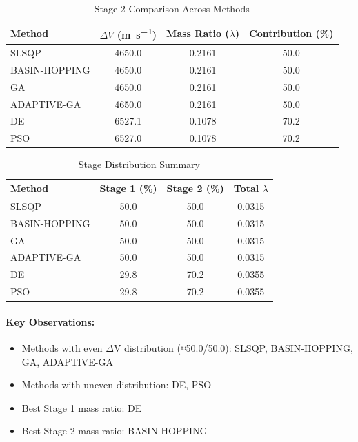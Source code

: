 \documentclass{article}
\begin{document}
\begin{table}[H]
\centering
\caption{Stage 2 Comparison Across Methods}
\begin{tabular}{lS[table-format=4.1]S[table-format=1.4]S[table-format=3.1]}
\toprule
Method & {$\Delta V$ (\si{\meter\per\second})} & {Mass Ratio ($\lambda$)} & {Contribution (\%)} \\
\midrule
SLSQP        & 4650.0 & 0.2161 & 50.0 \\
BASIN-HOPPING & 4650.0 & 0.2161 & 50.0 \\
GA           & 4650.0 & 0.2161 & 50.0 \\
ADAPTIVE-GA  & 4650.0 & 0.2161 & 50.0 \\
DE           & 6527.1 & 0.1078 & 70.2 \\
PSO          & 6527.0 & 0.1078 & 70.2 \\
\bottomrule
\end{tabular}
\end{table}

\begin{table}[H]
\centering
\caption{Stage Distribution Summary}
\begin{tabular}{lS[table-format=4.1]S[table-format=4.1]S[table-format=1.4]}
\toprule
Method & {Stage 1 (\%)} & {Stage 2 (\%)} & {Total $\lambda$} \\
\midrule
SLSQP        & 50.0 & 50.0 & 0.0315 \\
BASIN-HOPPING & 50.0 & 50.0 & 0.0315 \\
GA           & 50.0 & 50.0 & 0.0315 \\
ADAPTIVE-GA  & 50.0 & 50.0 & 0.0315 \\
DE           & 29.8 & 70.2 & 0.0355 \\
PSO          & 29.8 & 70.2 & 0.0355 \\
\bottomrule
\end{tabular}
\end{table}

\paragraph{Key Observations:}
\begin{itemize}
\item Methods with even $\Delta$V distribution (≈50.0/50.0): SLSQP, BASIN-HOPPING, GA, ADAPTIVE-GA
\item Methods with uneven distribution: DE, PSO
\item Best Stage 1 mass ratio: DE
\item Best Stage 2 mass ratio: BASIN-HOPPING
\end{itemize}
\end{document}
